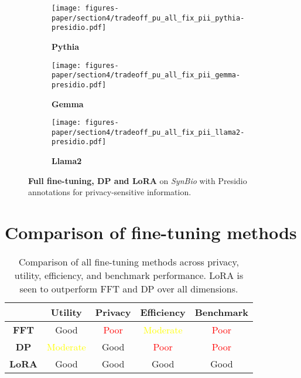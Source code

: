 \begin{figure}[h!]
    \centering
    \begin{subfigure}{0.48\linewidth}
    \centering
    \texttt{[image: figures-paper/section4/tradeoff\_pu\_all\_fix\_pii\_pythia-presidio.pdf]}
    \caption{\textbf{Pythia}}
    \label{fig:appendix-fdl_pii1}
    \end{subfigure}
    \begin{subfigure}{0.48\linewidth}
    \centering
    \texttt{[image: figures-paper/section4/tradeoff\_pu\_all\_fix\_pii\_gemma-presidio.pdf]}
    \caption{\textbf{Gemma}}
    \label{fig:appendix-fdl_pii2}
    \end{subfigure}
    \begin{subfigure}{0.48\linewidth}
    \centering
    \texttt{[image: figures-paper/section4/tradeoff\_pu\_all\_fix\_pii\_llama2-presidio.pdf]}
    \caption{\textbf{Llama2}}
    \label{fig:appendix-fdl_pii3}
    \end{subfigure}
    \caption{\textbf{Full fine-tuning, DP and LoRA} on \emph{SynBio} with Presidio annotations for privacy-sensitive information.}
    \label{fig:appendix-fdl_pii}
\end{figure}



\section{Comparison of fine-tuning methods}
\label{appendix:comparison}


\begin{table}[H]
\centering
\scriptsize
\caption{Comparison of all fine-tuning methods across privacy, utility, efficiency, and benchmark performance. LoRA is seen to outperform FFT and DP over all dimensions.}
\label{tab:overall}
\begin{tabular}{|c|c|c|c|c|}
\hline
 & \textbf{Utility} & \textbf{Privacy} & \textbf{Efficiency} & \textbf{Benchmark} \\
\hline
\textbf{FFT} & \textcolor{gemmagreen}{Good} & \textcolor{red}{Poor} & \textcolor{yellow}{Moderate} & \textcolor{red}{Poor} \\
\hline
\textbf{DP} & \textcolor{yellow}{Moderate} & \textcolor{gemmagreen}{Good} & \textcolor{red}{Poor} & \textcolor{red}{Poor} \\
\hline
\rowcolor{green!20}
\textbf{LoRA} & \textcolor{gemmagreen}{Good} & \textcolor{gemmagreen}{Good} & \textcolor{gemmagreen}{Good} & \textcolor{gemmagreen}{Good} \\
\hline
\end{tabular}
\end{table}